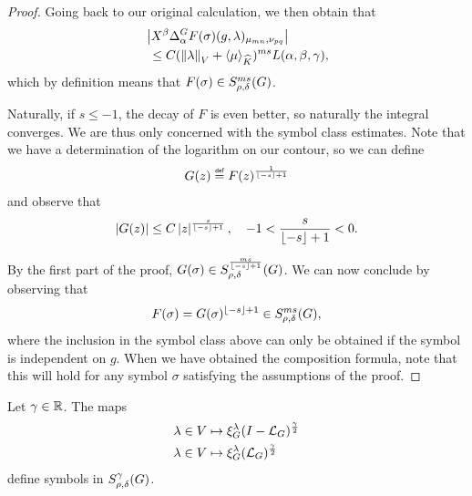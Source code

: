 \begin{proof}
    Going back to our original calculation,
    we then obtain that
    \begin{align*}
        &\abs {%
            \LeftDifferentialOperator \beta \DifferenceOperator \alpha
            F(\sigma)(g, \lambda)_{\mu_{m n}, \nu_{p q}}
        }\\
        &\ \leq C
        (\norm \lambda + \JapaneseBracket \CompactGroup \mu)^{m s}
        L(\alpha, \beta, \gamma),
    \end{align*}
    which by definition means that $F(\sigma) \in S^{m s}_{\rho, \delta}(G)$.

    Naturally, if $s \leq -1$, the decay of $F$ is even better, so naturally the integral converges.
    We are thus only concerned with the symbol class estimates.
    Note that we have a determination of the logarithm on our contour,
    so we can define
    \begin{align*}
        G(z) \defeq F(z)^{\frac 1 {\Floor{-s} + 1}}
    \end{align*}
    and observe that
    \begin{align*}
        \left|{G(z)}\right| \leq C \left|{z}\right|^{\frac s {\lfloor-s\rfloor + 1}},
        \quad
        -1 < \frac s {\lfloor-s\rfloor + 1} < 0.
    \end{align*}

    By the first part of the proof,
    $G(\sigma) \in S^{\frac {m s} {\lfloor-s\rfloor +1}}_{\rho, \delta}(G)$.
    We can now conclude by observing that
    \begin{align*}
        F(\sigma) = G(\sigma)^{\lfloor-s\rfloor + 1} \in S^{m s}_{\rho, \delta}(G),
    \end{align*}
    where the inclusion in the symbol class above can only be obtained
    if the symbol is independent on $g$.
    When we have obtained the composition formula,
    note that this will hold for any symbol $\sigma$ satisfying the assumptions of the proof.
\end{proof}

\begin{corollary}
\label{corollary:powers_of_the_Laplacian}
    Let $\gamma \in \mathbb{R}$.
    The maps
    \begin{align*}
        &\lambda \in V \mapsto \xi^{\lambda}_{G} (I - {\mathcal{L}_{G}})^\frac{\gamma}{2}\\
        &\lambda \in V \mapsto \xi^{\lambda}_{G} ({\mathcal{L}_{G}})^\frac \gamma 2
    \end{align*}
    define symbols in $S^{\gamma}_{\rho, \delta}(G)$.
\end{corollary}

